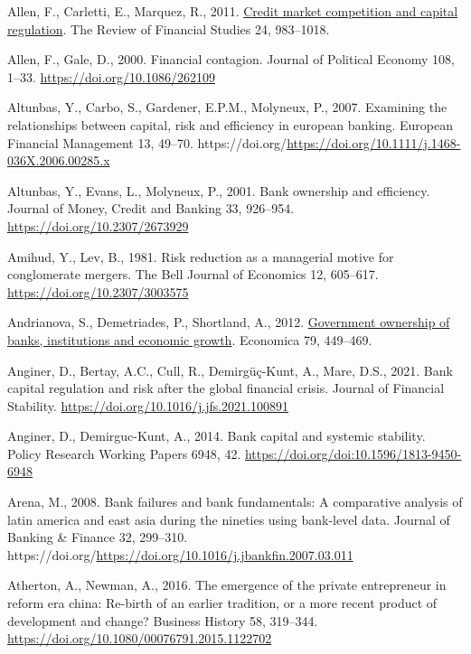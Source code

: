 \documentclass[
  letterpaper,
  DIV=11,
  numbers=noendperiod]{scrreprt}
\newlength{\cslhangindent}
\newenvironment{CSLReferences}[2] %
 {\begin{list}{}{%
  \setlength{\itemindent}{0pt}
  \setlength{\leftmargin}{0pt}
  \setlength{\parsep}{0pt}
  \ifodd #1
   \setlength{\leftmargin}{\cslhangindent}
   \setlength{\itemindent}{-1\cslhangindent}
  \fi
  \setlength{\itemsep}{#2\baselineskip}}}
 {\end{list}}
\begin{document}
\begin{CSLReferences}{1}{0}
Allen, F., Carletti, E., Marquez, R., 2011.
\href{http://www.jstor.org.queens.ezp1.qub.ac.uk/stable/20869263}{Credit
market competition and capital regulation}. The Review of Financial
Studies 24, 983--1018.

Allen, F., Gale, D., 2000. Financial contagion. Journal of Political
Economy 108, 1--33. \url{https://doi.org/10.1086/262109}

Altunbas, Y., Carbo, S., Gardener, E.P.M., Molyneux, P., 2007. Examining
the relationships between capital, risk and efficiency in european
banking. European Financial Management 13, 49--70.
https://doi.org/\url{https://doi.org/10.1111/j.1468-036X.2006.00285.x}

Altunbas, Y., Evans, L., Molyneux, P., 2001. Bank ownership and
efficiency. Journal of Money, Credit and Banking 33, 926--954.
\url{https://doi.org/10.2307/2673929}

Amihud, Y., Lev, B., 1981. Risk reduction as a managerial motive for
conglomerate mergers. The Bell Journal of Economics 12, 605--617.
\url{https://doi.org/10.2307/3003575}

Andrianova, S., Demetriades, P., Shortland, A., 2012.
\href{http://www.jstor.org/stable/23274805}{Government ownership of
banks, institutions and economic growth}. Economica 79, 449--469.

Anginer, D., Bertay, A.C., Cull, R., Demirgüç-Kunt, A., Mare, D.S.,
2021. Bank capital regulation and risk after the global financial
crisis. Journal of Financial Stability.
\url{https://doi.org/10.1016/j.jfs.2021.100891}

Anginer, D., Demirguc-Kunt, A., 2014. Bank capital and systemic
stability. Policy Research Working Papers 6948, 42.
\url{https://doi.org/doi:10.1596/1813-9450-6948}

Arena, M., 2008. Bank failures and bank fundamentals: A comparative
analysis of latin america and east asia during the nineties using
bank-level data. Journal of Banking \& Finance 32, 299--310.
https://doi.org/\url{https://doi.org/10.1016/j.jbankfin.2007.03.011}

Atherton, A., Newman, A., 2016. The emergence of the private
entrepreneur in reform era china: Re-birth of an earlier tradition, or a
more recent product of development and change? Business History 58,
319--344. \url{https://doi.org/10.1080/00076791.2015.1122702}


\end{CSLReferences}
\end{document}
